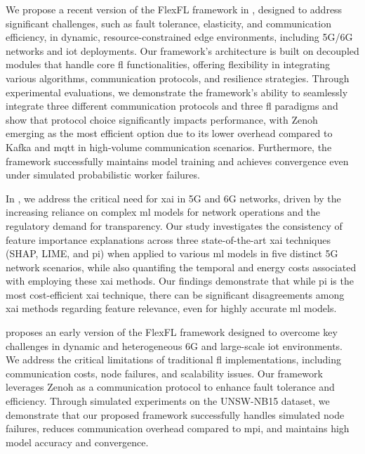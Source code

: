 We propose a recent version of the FlexFL framework in \cite{LeonardoAlmeida2025}, designed to address significant challenges, such as fault tolerance, elasticity, and communication efficiency, in dynamic, resource-constrained edge environments, including 5G/6G networks and \ac{iot} deployments. Our framework's architecture is built on decoupled modules that handle core \ac{fl} functionalities, offering flexibility in integrating various algorithms, communication protocols, and resilience strategies. Through experimental evaluations, we demonstrate the framework's ability to seamlessly integrate three different communication protocols and three \ac{fl} paradigms and show that protocol choice significantly impacts performance, with Zenoh emerging as the most efficient option due to its lower overhead compared to Kafka and \ac{mqtt} in high-volume communication scenarios. Furthermore, the framework successfully maintains model training and achieves convergence even under simulated probabilistic worker failures.

In \cite{Corona2024}, we address the critical need for \ac{xai} in 5G and 6G networks, driven by the increasing reliance on complex \ac{ml} models for network operations and the regulatory demand for transparency. Our study investigates the consistency of feature importance explanations across three state-of-the-art \ac{xai} techniques (SHAP, LIME, and \ac{pi}) when applied to various \ac{ml} models in five distinct 5G network scenarios, while also quantifing the temporal and energy costs associated with employing these \ac{xai} methods. Our findings demonstrate that while \ac{pi} is the most cost-efficient \ac{xai} technique, there can be significant disagreements among \ac{xai} methods regarding feature relevance, even for highly accurate \ac{ml} models.

\cite{fl-icct} proposes an early version of the FlexFL framework designed to overcome key challenges in dynamic and heterogeneous 6G and large-scale \ac{iot} environments. We address the critical limitations of traditional \ac{fl} implementations, including communication costs, node failures, and scalability issues. Our framework leverages Zenoh as a communication protocol to enhance fault tolerance and efficiency. Through simulated experiments on the UNSW-NB15 dataset, we demonstrate that our proposed framework successfully handles simulated node failures, reduces communication overhead compared to \ac{mpi}, and maintains high model accuracy and convergence.

